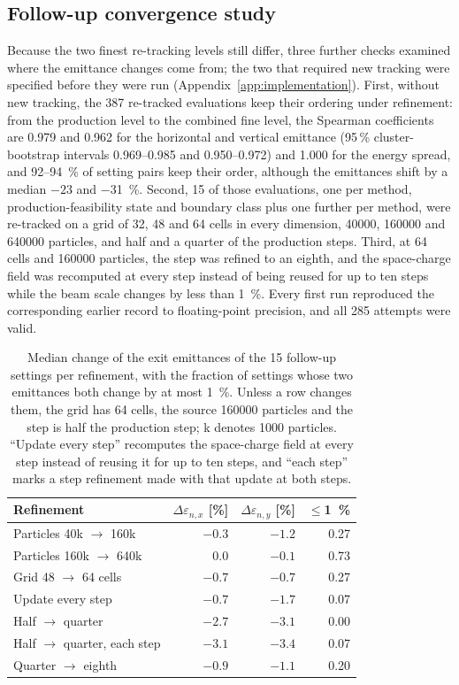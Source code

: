 \documentclass[aps,prab,reprint,superscriptaddress,amsmath,amssymb,floatfix]{revtex4-2}
\newcommand{\enx}{\varepsilon_{n,x}}
\newcommand{\eny}{\varepsilon_{n,y}}
\begin{document}
\subsection{Follow-up convergence study}
\label{sec:convergence_followup}
Because the two finest re-tracking levels still differ, three further checks examined
where the emittance changes come from; the two that required new tracking were specified
before they were run
(Appendix~\ref{app:implementation}). First, without new tracking, the 387 re-tracked
evaluations keep their ordering under refinement: from the production level to the combined
fine level, the Spearman coefficients are 0.979 and 0.962 for the horizontal and vertical
emittance (95\,\% cluster-bootstrap intervals 0.969--0.985 and 0.950--0.972) and 1.000 for the
energy spread, and 92--\SI{94}{\percent} of setting pairs keep their order, although the
emittances shift by a median $-23$ and \SI{-31}{\percent}. Second, 15 of those evaluations,
one per method, production-feasibility state and boundary class plus one further per method,
were re-tracked on a grid of 32, 48 and 64 cells in every dimension, \num{40000},
\num{160000} and \num{640000} particles, and half and a quarter of the production steps.
Third, at 64 cells and \num{160000} particles, the step was refined to an eighth, and the
space-charge field was recomputed at every step instead of being reused for up to ten steps
while the beam scale changes by less than \SI{1}{\percent}. Every first run reproduced the
corresponding earlier record to floating-point precision, and all 285 attempts were valid.

\begin{table}[htbp]
\centering
\caption{Median change of the exit emittances of the 15 follow-up settings per refinement,
with the fraction of settings whose two emittances both change by at most \SI{1}{\percent}.
Unless a row changes them, the grid has 64 cells, the source \num{160000} particles and the
step is half the production step; k denotes \num{1000} particles. ``Update every step''
recomputes the space-charge field at every step instead of reusing it for up to ten steps, and
``each step'' marks a step refinement made with that update at both steps.}
\label{tab:convergence_followup}
\small
\setlength{\tabcolsep}{4pt}
\begin{tabular}{lrrr}
\toprule
Refinement & $\Delta\enx$ [\%] & $\Delta\eny$ [\%] & $\le$\SI{1}{\percent} \\
\midrule
Particles 40k $\to$ 160k & $-0.3$ & $-1.2$ & 0.27 \\
Particles 160k $\to$ 640k & $0.0$ & $-0.1$ & 0.73 \\
Grid 48 $\to$ 64 cells & $-0.7$ & $-0.7$ & 0.27 \\
Update every step & $-0.7$ & $-1.7$ & 0.07 \\
Half $\to$ quarter & $-2.7$ & $-3.1$ & 0.00 \\
Half $\to$ quarter, each step & $-3.1$ & $-3.4$ & 0.07 \\
Quarter $\to$ eighth & $-0.9$ & $-1.1$ & 0.20 \\
\bottomrule
\end{tabular}
\end{table}
\end{document}
